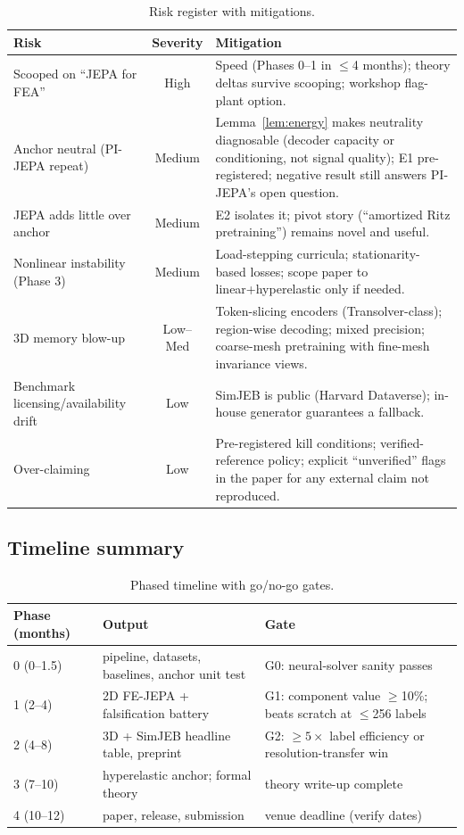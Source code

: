 \documentclass[11pt]{article}
\begin{document}
\begin{table}[h]
\centering
\small
\begin{tabular}{@{}p{3.6cm}cp{7.6cm}@{}}
\toprule
\textbf{Risk} & \textbf{Severity} & \textbf{Mitigation}\\
\midrule
Scooped on ``JEPA for FEA'' & High & Speed (Phases 0--1 in $\le$4 months);
theory deltas survive scooping; workshop flag-plant option.\\
Anchor neutral (PI-JEPA repeat) & Medium & Lemma~\ref{lem:energy} makes
neutrality diagnosable (decoder capacity or conditioning, not signal
quality); E1 pre-registered; negative result still answers PI-JEPA's open
question.\\
JEPA adds little over anchor & Medium & E2 isolates it; pivot story
(``amortized Ritz pretraining'') remains novel and useful.\\
Nonlinear instability (Phase 3) & Medium & Load-stepping curricula;
stationarity-based losses; scope paper to linear+hyperelastic only if
needed.\\
3D memory blow-up & Low--Med & Token-slicing encoders (Transolver-class);
region-wise decoding; mixed precision; coarse-mesh pretraining with
fine-mesh invariance views.\\
Benchmark licensing/availability drift & Low & SimJEB is public
(Harvard Dataverse); in-house generator guarantees a fallback.\\
Over-claiming & Low & Pre-registered kill conditions; verified-reference
policy; explicit ``unverified'' flags in the paper for any external claim
not reproduced.\\
\bottomrule
\end{tabular}
\caption{Risk register with mitigations.}
\label{tab:risk}
\end{table}

\subsection{Timeline summary}

\begin{table}[h]
\centering
\small
\begin{tabular}{@{}lp{5.2cm}p{5.6cm}@{}}
\toprule
\textbf{Phase (months)} & \textbf{Output} & \textbf{Gate}\\
\midrule
0 (0--1.5) & pipeline, datasets, baselines, anchor unit test & G0: neural-solver sanity passes\\
1 (2--4) & 2D FE-JEPA + falsification battery & G1: component value $\ge$10\%; beats scratch at $\le$256 labels\\
2 (4--8) & 3D + SimJEB headline table, preprint & G2: $\ge 5\times$ label efficiency or resolution-transfer win\\
3 (7--10) & hyperelastic anchor; formal theory & theory write-up complete\\
4 (10--12) & paper, release, submission & venue deadline (verify dates)\\
\bottomrule
\end{tabular}
\caption{Phased timeline with go/no-go gates.}
\label{tab:timeline}
\end{table}
\end{document}
